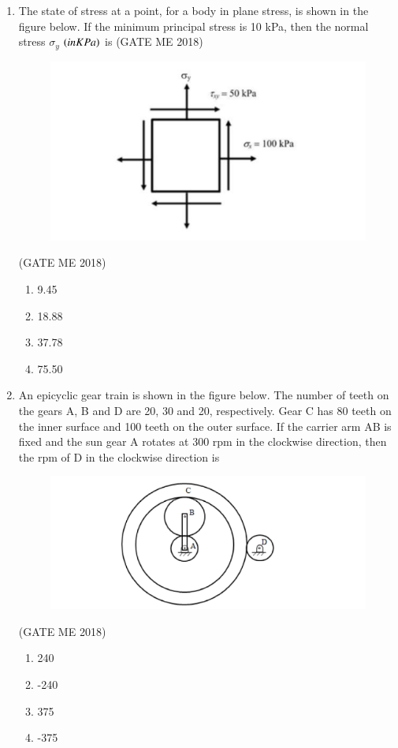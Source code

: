 \documentclass[journal]{IEEEtran}
\numberwithin{equation}{enumi}
\numberwithin{figure}{enumi}
\begin{document}
\begin{enumerate}
\item The state of stress at a point, for a body in plane stress, is shown in the figure below. If the
minimum principal stress is 10 kPa, then the normal stress $\sigma_y$ $\left(in KPa\right)$ is
\hfill{(GATE ME 2018)}
\begin{figure}[H]
    \centering
    \includegraphics[width = 0.6\columnwidth]{figs/fig3.5.png}
    \caption*{}
    \label{fig:Q28}
    \end{figure}
    \hfill{(GATE ME 2018)}
    \begin{enumerate}
    \item 9.45
    \item 18.88
    \item 37.78
    \item 75.50
    \end{enumerate}
    \item An epicyclic gear train is shown in the figure below. The number of teeth on the gears A, B
and D are 20, 30 and 20, respectively. Gear C has 80 teeth on the inner surface and 100 teeth
on the outer surface. If the carrier arm AB is fixed and the sun gear A rotates at 300 rpm in
the clockwise direction, then the rpm of D in the clockwise direction is
\begin{figure}[H]
    \centering
    \includegraphics[width = 0.6\columnwidth]{figs/fig3.6.png}
    \caption*{}
    \label{fig:Q29}
    \end{figure}
    \hfill{(GATE ME 2018)}
    \begin{enumerate}
    \item 240
    \item -240
    \item 375
    \item -375
    \end{enumerate}


\end{enumerate}
\end{document}
